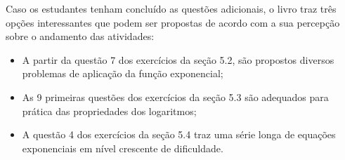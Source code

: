\documentclass[main_estudante.tex]{subfiles}
\begin{document}
Caso os estudantes tenham concluído as questões adicionais, o livro  traz três opções interessantes que podem ser propostas de acordo com a sua percepção sobre o andamento das atividades:

\begin{itemize}
 \item A partir da questão 7 dos exercícios da seção 5.2, são propostos diversos problemas de aplicação da função exponencial;
 \item As 9 primeiras questões dos exercícios da seção 5.3 são adequados para prática das propriedades dos logaritmos;
 \item A questão 4 dos exercícios da seção 5.4 traz uma série longa de equações exponenciais em nível crescente de dificuldade.
\end{itemize}
\end{document}
